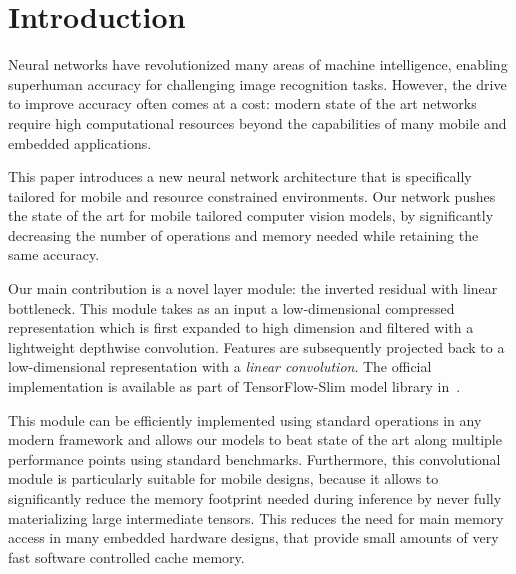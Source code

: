\documentclass[10pt,twocolumn,letterpaper]{article}
\begin{document}
\section{Introduction}
Neural networks have revolutionized many areas of machine intelligence, enabling superhuman accuracy for challenging image recognition tasks. However, the drive to improve accuracy often comes at a cost: modern state of the art networks require high computational resources beyond the capabilities of many mobile and embedded applications. 

This paper introduces a new neural network architecture that is specifically tailored for mobile and resource constrained environments. Our network pushes the state of the art for mobile tailored computer vision models, by significantly decreasing the number of operations and memory needed while retaining the same accuracy.

Our main contribution is a novel layer module: the inverted residual with linear bottleneck. This module takes as an input a low-dimensional compressed representation which is first expanded to high dimension and filtered with a lightweight depthwise convolution. Features are subsequently projected back to a low-dimensional representation with a {\em linear convolution}. The official implementation is available as part of TensorFlow-Slim model library in~\cite{MobilenetV2-implementation}.

This module can be efficiently implemented using standard operations in any modern framework and allows
our models to beat state of the art along multiple performance points using standard benchmarks.
Furthermore, this convolutional module is particularly suitable for mobile designs, because it allows to significantly reduce the memory footprint needed during inference by never fully materializing large intermediate tensors. This reduces the need for main memory access in many embedded hardware designs, that provide small amounts of very fast software controlled cache memory. 
\end{document}

